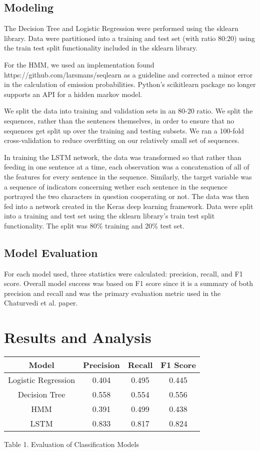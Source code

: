 \documentclass[11pt,a4paper]{article}
\begin{document}
\subsection{Modeling}
The Decision Tree and Logistic Regression were performed using the sklearn library. Data were partitioned into a training and test set (with ratio 80:20) using the train test split functionality included in the sklearn library. 

For the HMM, we used an implementation found https://github.com/larsmans/seqlearn as a guideline and corrected a minor error in the calculation of emission probabilities. Python's scikitlearn package no longer supports an API for a hidden markov model. 

We split the data into training and validation sets in an 80-20 ratio. We split the sequences, rather than the sentences themselves, in order to ensure that no sequences get split up over the training and testing subsets. We ran a 100-fold cross-validation to reduce overfitting on our relatively small set of sequences.

In training the LSTM network, the data was transformed so that rather than feeding in one sentence at a time, each observation was a concatenation of all of the features for every sentence in the sequence. Similarly, the target variable was a sequence of indicators concerning wether each sentence in the sequence portrayed the two characters in question cooperating or not. The data was then fed into a network created in the Keras deep learning framework. Data were split into a training and test set using the sklearn library's train test split functionality. The split was 80\% training and 20\% test set.

\subsection{Model Evaluation}

For each model used, three statistics were calculated: precision, recall, and F1 score. Overall model success was based on F1 score since it is a summary of both precision and recall and was the primary evaluation metric used in the Chaturvedi et al. paper.

\section{Results and Analysis}

\begin{center}
 \begin{tabular}{||c c c c||} 
 \hline
 Model & Precision & Recall & F1 Score \\ [0.5ex] 
 \hline\hline
 Logistic Regression & 0.404 & 0.495 & 0.445 \\ 
 \hline
 Decision Tree & 0.558 & 0.554 & 0.556 \\
 \hline
 HMM & 0.391 & 0.499 & 0.438 \\
 \hline
 LSTM & 0.833 & 0.817 & 0.824 \\
 \hline
\end{tabular}
\caption{Table 1. Evaluation of Classification Models}
\label{table:1}
\end{center}
\end{document}
